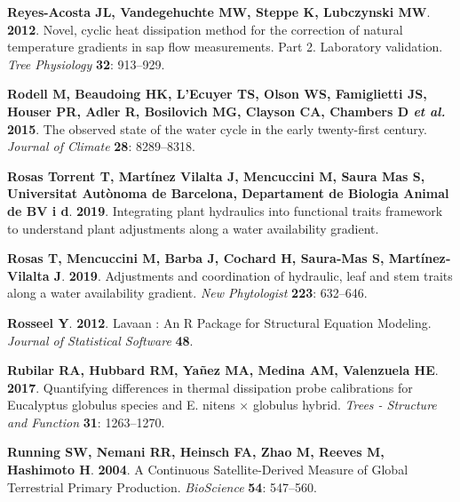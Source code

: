 \documentclass[11pt,twoside]{reedthesis}
\begin{document}
\hypertarget{ref-Reyes-Acosta2012}{}
\textbf{\textnormal{Reyes-Acosta JL}, \textnormal{Vandegehuchte MW},
\textnormal{Steppe K}, \textnormal{Lubczynski MW}}. \textbf{2012}.
Novel, cyclic heat dissipation method for the correction of natural
temperature gradients in sap flow measurements. Part 2. Laboratory
validation. \emph{Tree Physiology} \textbf{32}: 913--929.

\hypertarget{ref-Rodell2015}{}
\textbf{\textnormal{Rodell M}, \textnormal{Beaudoing HK},
\textnormal{L'Ecuyer TS}, \textnormal{Olson WS}, \textnormal{Famiglietti
JS}, \textnormal{Houser PR}, \textnormal{Adler R},
\textnormal{Bosilovich MG}, \textnormal{Clayson CA},
\textnormal{Chambers D} \emph{et al.}} \textbf{2015}. The observed state
of the water cycle in the early twenty-first century. \emph{Journal of
Climate} \textbf{28}: 8289--8318.

\hypertarget{ref-rosas_torrent_integrating_2019}{}
\textbf{\textnormal{Rosas Torrent T}, \textnormal{Martínez Vilalta J},
\textnormal{Mencuccini M}, \textnormal{Saura Mas S},
\textnormal{Universitat Autònoma de Barcelona}, \textnormal{Departament
de Biologia Animal de BV i d}}. \textbf{2019}. Integrating plant
hydraulics into functional traits framework to understand plant
adjustments along a water availability gradient.

\hypertarget{ref-rosas_adjustments_2019}{}
\textbf{\textnormal{Rosas T}, \textnormal{Mencuccini M},
\textnormal{Barba J}, \textnormal{Cochard H}, \textnormal{Saura‐Mas S},
\textnormal{Martínez‐Vilalta J}}. \textbf{2019}. Adjustments and
coordination of hydraulic, leaf and stem traits along a water
availability gradient. \emph{New Phytologist} \textbf{223}: 632--646.

\hypertarget{ref-rosseel_lavaan_2012}{}
\textbf{\textnormal{Rosseel Y}}. \textbf{2012}. Lavaan : An R Package
for Structural Equation Modeling. \emph{Journal of Statistical Software}
\textbf{48}.

\hypertarget{ref-Rubilar2017}{}
\textbf{\textnormal{Rubilar RA}, \textnormal{Hubbard RM},
\textnormal{Yañez MA}, \textnormal{Medina AM}, \textnormal{Valenzuela
HE}}. \textbf{2017}. Quantifying differences in thermal dissipation
probe calibrations for Eucalyptus globulus species and E. nitens ×
globulus hybrid. \emph{Trees - Structure and Function} \textbf{31}:
1263--1270.

\hypertarget{ref-Running2004}{}
\textbf{\textnormal{Running SW}, \textnormal{Nemani RR},
\textnormal{Heinsch FA}, \textnormal{Zhao M}, \textnormal{Reeves M},
\textnormal{Hashimoto H}}. \textbf{2004}. A Continuous Satellite-Derived
Measure of Global Terrestrial Primary Production. \emph{BioScience}
\textbf{54}: 547--560.
\end{document}
